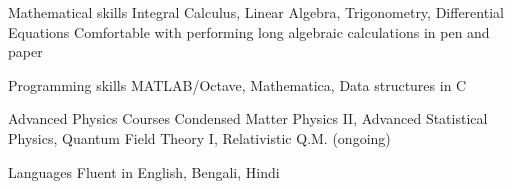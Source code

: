 

\begin{cvskills}


  
  \cvskill
	{Mathematical skills} %
	{Integral Calculus, Linear Algebra, Trigonometry, Differential Equations}
  \cvskill
	{}
	{Comfortable with performing long algebraic calculations in pen and paper} %

  \cvskill
    {Programming skills} %
    {MATLAB/Octave, Mathematica, Data structures in C} %

  \cvskill
{Advanced Physics Courses} %
{Condensed Matter Physics II, Advanced Statistical Physics, Quantum Field Theory I,  Relativistic Q.M. (ongoing)} %

  \cvskill
    {Languages} %
    {Fluent in English, Bengali, Hindi} %

\end{cvskills}
